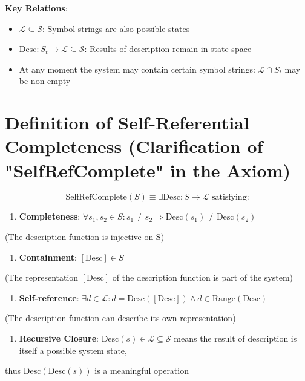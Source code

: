 \textbf{Key Relations}:
\begin{itemize}
\item $\mathcal{L} \subseteq \mathcal{S}$: Symbol strings are also possible states
\item $\text{Desc}: S_t \to \mathcal{L} \subseteq \mathcal{S}$: Results of description remain in state space
\item At any moment the system may contain certain symbol strings: $\mathcal{L} \cap S_t$ may be non-empty
\end{itemize}

\section{Definition of Self-Referential Completeness (Clarification of "SelfRefComplete" in the Axiom)}
\label{sec:ch02_axiom:definition-of-self-referential-completeness-clarification-of-selfrefcomplete-in-the-axiom}

\begin{equation}
\text{SelfRefComplete}(S) \equiv \exists \text{Desc}: S \to \mathcal{L} \text{ satisfying:}
\end{equation}

\begin{enumerate}
\item \textbf{Completeness}: $\forall s_1, s_2 \in S: s_1 \neq s_2 \Rightarrow \text{Desc}(s_1) \neq \text{Desc}(s_2)$
\end{enumerate}
   (The description function is injective on S)

\begin{enumerate}
\item \textbf{Containment}: $[\text{Desc}] \in S$ 
\end{enumerate}
   (The representation $[\text{Desc}]$ of the description function is part of the system)

\begin{enumerate}
\item \textbf{Self-reference}: $\exists d \in \mathcal{L}: d = \text{Desc}([\text{Desc}]) \land d \in \text{Range}(\text{Desc})$
\end{enumerate}
   (The description function can describe its own representation)

\begin{enumerate}
\item \textbf{Recursive Closure}: $\text{Desc}(s) \in \mathcal{L} \subseteq \mathcal{S}$ means the result of description is itself a possible system state,
\end{enumerate}
   thus $\text{Desc}(\text{Desc}(s))$ is a meaningful operation

